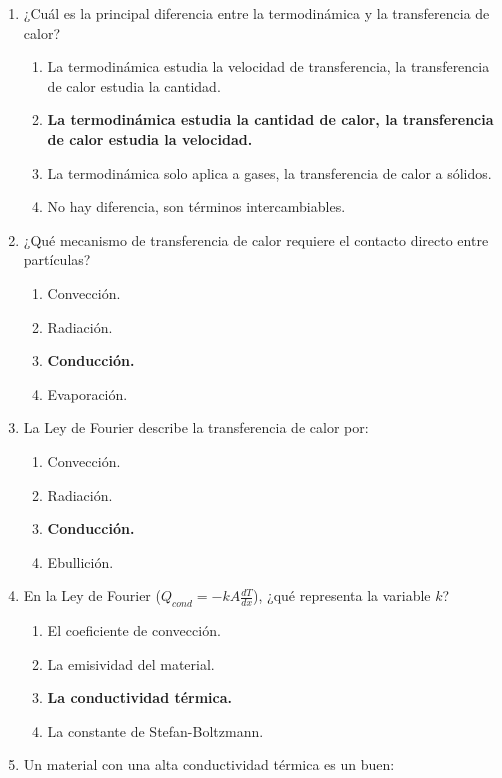 \documentclass{article}
\begin{document}
	\begin{enumerate}[label=\arabic*.]
		
		\item ¿Cuál es la principal diferencia entre la termodinámica y la transferencia de calor?
		\begin{enumerate}[label=\alph*).]
			\item La termodinámica estudia la velocidad de transferencia, la transferencia de calor estudia la cantidad.
			\item \textbf{La termodinámica estudia la cantidad de calor, la transferencia de calor estudia la velocidad.}
			\item La termodinámica solo aplica a gases, la transferencia de calor a sólidos.
			\item No hay diferencia, son términos intercambiables.
		\end{enumerate}
		
		\item ¿Qué mecanismo de transferencia de calor requiere el contacto directo entre partículas?
		\begin{enumerate}[label=\alph*.]
			\item Convección.
			\item Radiación.
			\item \textbf{Conducción.}
			\item Evaporación.
		\end{enumerate}
		
		\item La Ley de Fourier describe la transferencia de calor por:
		\begin{enumerate}[label=\alph*)]
			\item Convección.
			\item Radiación.
			\item \textbf{Conducción.}
			\item Ebullición.
		\end{enumerate}
		
		\item En la Ley de Fourier ($Q_{cond} = -k A \frac{dT}{dx}$), ¿qué representa la variable $k$?
		\begin{enumerate}[label=\alph*)]
			\item El coeficiente de convección.
			\item La emisividad del material.
			\item \textbf{La conductividad térmica.}
			\item La constante de Stefan-Boltzmann.
		\end{enumerate}
		 \item Un material con una alta conductividad térmica es un buen:
		

\end{enumerate}
\end{document}
